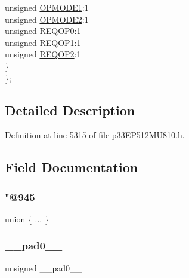 \begin{DoxyCompactItemize}
\begin{tabbing}
\>\>unsigned \hyperlink{structtag_c2_c_t_r_l1_b_i_t_s_ac1a3a1e4bc60876e8fffd5fa5a4438d0}{OPMODE1}:1\\
\>\>unsigned \hyperlink{structtag_c2_c_t_r_l1_b_i_t_s_a8da4b1152099e22fc9039236c54cad0d}{OPMODE2}:1\\
\>\>unsigned \hyperlink{structtag_c2_c_t_r_l1_b_i_t_s_a7d461c6ec9a4d57968eb5e01eb49b4bd}{REQOP0}:1\\
\>\>unsigned \hyperlink{structtag_c2_c_t_r_l1_b_i_t_s_a0f28e42eb67e01b2b0b5e0f80f9b549d}{REQOP1}:1\\
\>\>unsigned \hyperlink{structtag_c2_c_t_r_l1_b_i_t_s_adc514515672b885adedefd72b3633293}{REQOP2}:1\\
\>\} \\
\}; \\

\end{tabbing}\end{DoxyCompactItemize}


\subsection{Detailed Description}


Definition at line 5315 of file p33\+E\+P512\+M\+U810.\+h.



\subsection{Field Documentation}
\mbox{\label{structtag_c2_c_t_r_l1_b_i_t_s_aec03b12a6d352c12ee63a4a983fd501f}} 
\subsubsection{\texorpdfstring{"@945}{@945}}
{\footnotesize\ttfamily union \{ ... \} }

\mbox{\label{structtag_c2_c_t_r_l1_b_i_t_s_adf71f3d8410c1f1dbbc96680a92c49af}} 
\subsubsection{\texorpdfstring{\+\_\+\+\_\+pad0\+\_\+\+\_\+}{\_\_pad0\_\_}}
{\footnotesize\ttfamily unsigned \+\_\+\+\_\+pad0\+\_\+\+\_\+}



